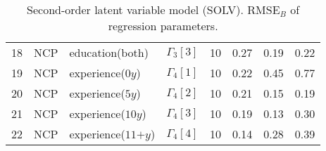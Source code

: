 \begin{table}[H]
\begin{tabular}{rlllrrrr}
		18 & NCP & \footnotesize{education(both)} & $\Gamma_{3}[3]$ & 10 & 0.27 & 0.19 & 0.22 \\ 
		19 & NCP & \footnotesize{experience($0y$)} & $\Gamma_{4}[1]$ & 10 & 0.22 & 0.45 & 0.77 \\ 
		20 & NCP & \footnotesize{experience($5y$)} & $\Gamma_{4}[2]$ & 10 & 0.21 & 0.15 & 0.19 \\ 
		21 & NCP & \footnotesize{experience($10y$)} & $\Gamma_{4}[3]$ & 10 & 0.19 & 0.13 & 0.30 \\
		22 & NCP & \footnotesize{experience($11\text{+}y$)} & $\Gamma_{4}[4]$ & 10 & 0.14 & 0.28 & 0.39 \\   
		\hline
	\end{tabular}
	\caption[Second-order latent variable model (SOLV). $\text{RMSE}_{B}$ of regression parameters.]%
	{Second-order latent variable model (SOLV). $\text{RMSE}_{B}$ of regression parameters.} 
	\label{tab:SOLV_RMSE_regression}
\end{table}

